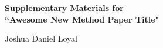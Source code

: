 \clearpage
\baselineskip=18pt

\setcounter{page}{1}
\setcounter{section}{0}
\setcounter{equation}{0}
\setcounter{table}{0}
\setcounter{figure}{0}
\setcounter{sampler}{0}
\renewcommand{\thesubsection}{S.\arabic{subsection}}
\renewcommand\theequation{S.\arabic{equation}}
\renewcommand\thetable{S.\arabic{table}}
\renewcommand\thefigure{S.\arabic{figure}}
\renewcommand\thesampler{S.\arabic{sampler}}

\begin{center}
{\Large\textbf{Supplementary Materials for \\
``Awesome New Method Paper Title"}} \\

\smallskip

\blind
{
{\large Joshua Daniel Loyal}
}\fi
{}\blind
{
}\fi
\end{center}
